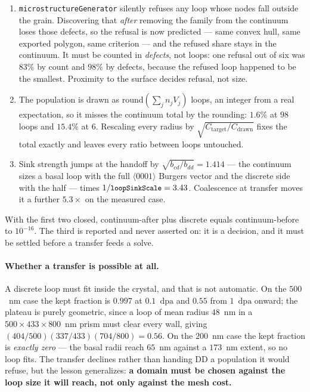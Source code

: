 \documentclass[11pt,a4paper]{article}
\newcommand{\code}[1]{\texttt{\small #1}}
\newcommand{\dpa}{\ensuremath{\mathrm{dpa}}}
\begin{document}
\begin{enumerate}\itemsep3pt
\item \code{microstructureGenerator} silently refuses any loop whose nodes fall
outside the grain. Discovering that \emph{after} removing the family from the
continuum loses those defects, so the refusal is now predicted --- same convex
hull, same exported polygon, same criterion --- and the refused share stays in
the continuum. It must be counted in \emph{defects}, not loops: one refusal out
of six was $83\%$ by count and $98\%$ by defects, because the refused loop
happened to be the smallest. Proximity to the surface decides refusal, not size.
\item The population is drawn as $\mathrm{round}(\sum_j n_j V_j)$ loops, an
integer from a real expectation, so it misses the continuum total by the
rounding: $1.6\%$ at $98$ loops and $15.4\%$ at $6$. Rescaling every radius by
$\sqrt{C_{\text{target}}/C_{\text{drawn}}}$ fixes the total exactly and leaves
every ratio between loops untouched.
\item Sink strength jumps at the handoff by $\sqrt{b_{cd}/b_{dd}} = 1.414$ ---
the continuum sizes a basal loop with the full $\langle 0001\rangle$ Burgers
vector and the discrete side with the half --- times $1/\code{loopSinkScale} =
3.43$. Coalescence at transfer moves it a further $5.3\times$ on the measured
case.
\end{enumerate}

\noindent
With the first two closed, continuum-after plus discrete equals
continuum-before to $10^{-16}$. The third is reported and never asserted on: it
is a decision, and it must be settled before a transfer feeds a solve.

\paragraph{Whether a transfer is possible at all.} A discrete loop must fit
inside the crystal, and that is not automatic. On the $500$~nm case the kept
fraction is $0.997$ at $0.1$~\dpa{} and $0.55$ from $1$~\dpa{} onward; the
plateau is purely geometric, since a loop of mean radius $48$~nm in a
$500\times433\times800$~nm prism must clear every wall, giving
$(404/500)(337/433)(704/800) = 0.56$. On the $200$~nm case the kept fraction is
\emph{exactly zero} --- the basal radii reach $65$~nm against a $173$~nm extent,
so no loop fits. The transfer declines rather than handing DD a population it
would refuse, but the lesson generalizes: \textbf{a domain must be chosen
against the loop size it will reach, not only against the mesh cost.}
\end{document}
